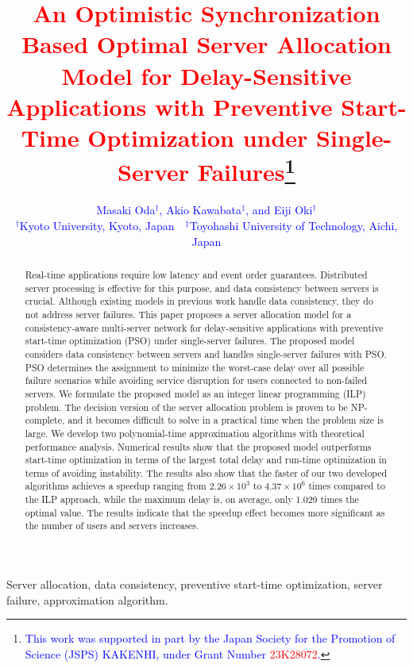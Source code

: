 \documentclass[10pt, letterpaper]{IEEEtran}
\newcommand\blue[1]{\textcolor{blue}{#1}}
\newcommand\red[1]{\textcolor{red}{#1}}
\begin{document}
\begin{CJK}{UTF8}{ipxm}

\title{\huge \red{An Optimistic Synchronization Based Optimal Server Allocation Model for Delay-Sensitive Applications with Preventive Start-Time Optimization under Single-Server Failures}\thanks{\blue{This work was supported in part by the Japan Society for the Promotion of Science (JSPS) KAKENHI, under Grant Number \red{23K28072}.}}}

\author{\blue{Masaki Oda$^\dag$, Akio Kawabata$^\ddag$, and Eiji Oki$^\dag$\\
$^\dag$Kyoto University, Kyoto, Japan\ \ $^\ddag$Toyohashi University of Technology, Aichi, Japan} 
}
\maketitle

\begin{abstract}
Real-time applications require low latency and event order guarantees.  
Distributed server processing is effective for this purpose, and data consistency between servers is crucial.  
Although existing models in previous work handle data consistency, they do not address server failures.  
This paper proposes a server allocation model for a consistency-aware multi-server network for delay-sensitive applications with preventive start-time optimization (PSO) under single-server failures.
The proposed model considers data consistency between servers and handles single-server failures with PSO.
PSO determines the assignment to minimize the worst-case delay over all possible failure scenarios while avoiding service disruption for users connected to non-failed servers.  
We formulate the proposed model as an integer linear programming (ILP) problem.  
The decision version of the server allocation problem is proven to be NP-complete, and it becomes difficult to solve in a practical time when the problem size is large.  
We develop two polynomial-time approximation algorithms with theoretical performance analysis. 
Numerical results show that the proposed model outperforms start-time optimization in terms of the largest total delay and run-time optimization in terms of avoiding instability.  
The results also show that the faster of our two developed algorithms achieves a speedup ranging from $2.26 \times 10^3$ to $4.37 \times 10^6$ times compared to the ILP approach, while the maximum delay is, on average, only 1.029 times the optimal value.
The results indicate that the speedup effect becomes more significant as the number of users and servers increases.
\end{abstract}
\begin{IEEEkeywords}
  Server allocation, data consistency, preventive start-time optimization, server failure, approximation algorithm.
\end{IEEEkeywords}


\end{CJK}
\end{document}
